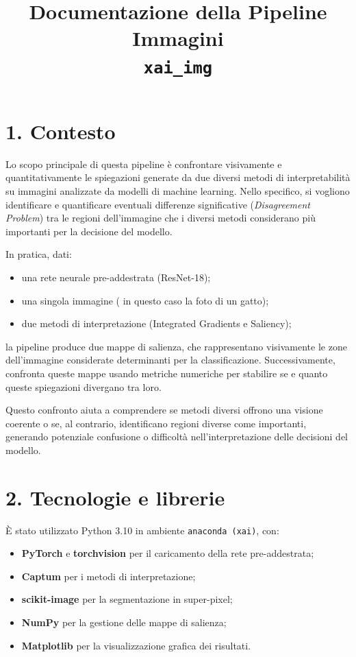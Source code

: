 \documentclass[a4paper,11pt]{article}
\title{Documentazione della Pipeline Immagini \\ \texttt{xai\_img}}
\begin{document}
\maketitle

\section*{1. Contesto}
Lo scopo principale di questa pipeline è confrontare visivamente e quantitativamente le spiegazioni generate da due diversi metodi di interpretabilità su immagini analizzate da modelli di machine learning. Nello specifico, si vogliono identificare e quantificare eventuali differenze significative (\emph{Disagreement Problem}) tra le regioni dell'immagine che i diversi metodi considerano più importanti per la decisione del modello.

In pratica, dati:
\begin{itemize}
\item una rete neurale pre-addestrata (ResNet-18);
\item una singola immagine ( in questo caso la foto di un gatto);
\item due metodi di interpretazione (Integrated Gradients e Saliency);
\end{itemize}
la pipeline produce due mappe di salienza, che rappresentano visivamente le zone dell'immagine considerate determinanti per la classificazione. Successivamente, confronta queste mappe usando metriche numeriche per stabilire se e quanto queste spiegazioni divergano tra loro.

Questo confronto aiuta a comprendere se metodi diversi offrono una visione coerente o se, al contrario, identificano regioni diverse come importanti, generando potenziale confusione o difficoltà nell'interpretazione delle decisioni del modello.

\section*{2. Tecnologie e librerie}
È stato utilizzato Python 3.10 in ambiente \texttt{anaconda (xai)}, con:
\begin{itemize}
\item \textbf{PyTorch} e \textbf{torchvision} per il caricamento della rete pre-addestrata;
\item \textbf{Captum} per i metodi di interpretazione;
\item \textbf{scikit-image} per la segmentazione in super-pixel;
\item \textbf{NumPy} per la gestione delle mappe di salienza;
\item \textbf{Matplotlib} per la visualizzazione grafica dei risultati.
\end{itemize}
\end{document}
